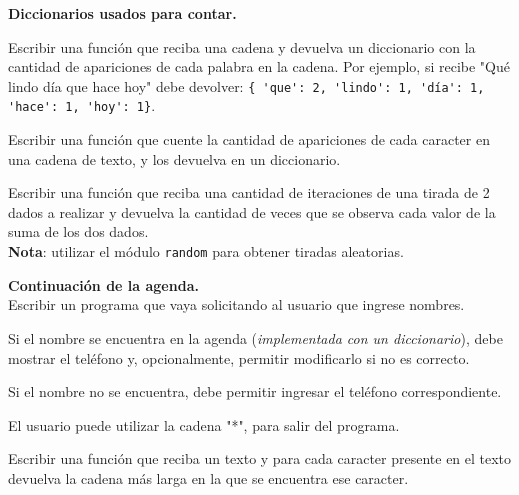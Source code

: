 \begin{ejercicio}
{\bf Diccionarios usados para contar.}
\begin{partes}
  \item Escribir una función que reciba una cadena y devuelva un diccionario con
la cantidad de apariciones de cada palabra en la cadena.  Por ejemplo, si
recibe "Qué lindo día que hace hoy" debe devolver:
\lstinline!{ 'que': 2, 'lindo': 1, 'día': 1, 'hace': 1, 'hoy': 1}!.

  \item Escribir una función que cuente la cantidad de apariciones de cada
caracter en una cadena de texto, y los devuelva en un diccionario.

  \item Escribir una función que reciba una cantidad de iteraciones de una tirada
de 2 dados a realizar y devuelva la cantidad de veces que se observa cada valor
de la suma de los dos dados. \\
{\bf Nota}: utilizar el módulo \verb!random! para obtener tiradas aleatorias.
\end{partes}
\end{ejercicio}

\begin{ejercicio}
{\bf Continuación de la agenda.} \\
Escribir un programa que vaya solicitando al usuario que ingrese nombres.
\begin{partes}
  \item Si el nombre se encuentra en la agenda ({\it implementada con un
diccionario}), debe mostrar el teléfono y, opcionalmente, permitir
modificarlo si no es correcto.
  \item Si el nombre no se encuentra, debe permitir ingresar el teléfono
correspondiente.
\end{partes}
El usuario puede utilizar la cadena "*", para salir del programa.
\end{ejercicio}

\begin{ejercicio}
Escribir una función que reciba un texto y para cada caracter presente en el
texto devuelva la cadena más larga en la que se encuentra ese caracter.
\end{ejercicio}

